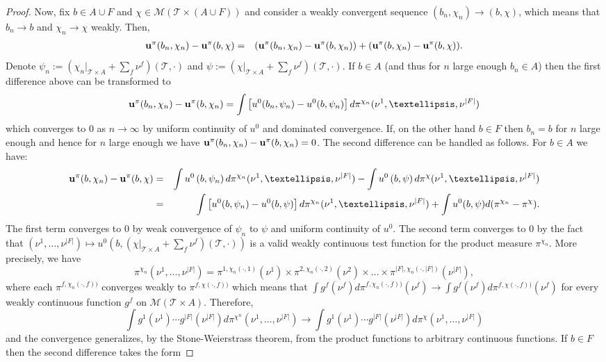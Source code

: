 \documentclass[10pt,a4paper]{amsart}
\begin{document}
\begin{proof}
Now, fix $b \in A \cup F$ and $\chi \in \mathcal{M}(\mathcal{T} \times (A \cup F))$ and consider a weakly convergent sequence $(b_n, \chi_n) \to (b, \chi)$, which means that $b_n \to b$ and $\chi_n \to \chi$ weakly. Then, 
\begin{eqnarray*}
\bold{u}^{\pi}(b_n,\chi_n) - \bold{u}^{\pi}(b,\chi) &=& (\bold{u}^{\pi}(b_n,\chi_n) - \bold{u}^{\pi}(b,\chi_n)) + (\bold{u}^{\pi}(b,\chi_n) - \bold{u}^{\pi}(b,\chi)).
\end{eqnarray*}
Denote $\psi_n := \left(\chi_n|_{\mathcal{T} \times A} + \sum_{f} \nu^f\right)(\mathcal{T},\cdot)$ and $\psi := \left(\chi|_{\mathcal{T} \times A} + \sum_{f} \nu^f\right)(\mathcal{T},\cdot)$. If $b \in A$ (and thus for $n$ large enough $b_n \in A$) then the first difference above can be transformed to
\begin{eqnarray*}
\bold{u}^{\pi}(b_n,\chi_n) - \bold{u}^{\pi}(b,\chi_n) =  \int \left[ u^{0}(b_n, \psi_n ) - u^{0}(b, \psi_n)\right] d\pi^{\chi_n}(\nu^1,\dots,\nu^{|F|})
\end{eqnarray*}
which converges to $0$ as $n \to \infty$ by uniform continuity of $u^0$ and dominated convergence. If, on the other hand $b \in F$ then $b_n = b$ for $n$ large enough and hence for $n$ large enough we have $\bold{u}^{\pi}(b_n,\chi_n) - \bold{u}^{\pi}(b,\chi_n) = 0$. 
The second difference can be handled as follows. For $b \in A$ we have:
\begin{eqnarray*}
\bold{u}^{\pi}(b,\chi_n) - \bold{u}^{\pi}(b,\chi) &=&    
\int  u^{0}\left(b, \psi_n \right) d\pi^{\chi_n}(\nu^1,\dots,\nu^{|F|}) - \int  u^{0}\left(b, \psi \right) d\pi^{\chi}(\nu^1,\dots,\nu^{|F|}) \\
&=& \int \left[u^0(b,\psi_n) - u^0(b,\psi)\right]d\pi^{\chi_n}(\nu^1,\dots,\nu^{|F|}) + \int u^0(b,\psi) d(\pi^{\chi_n} - \pi^{\chi}).
\end{eqnarray*}
The first term converges to $0$ by weak convergence of $\psi_n$ to $\psi$ and uniform continuity of $u^0$. The second term converges to $0$ by the fact that $(\nu^1,\dots,\nu^{|F|}) \mapsto u^{0}\left(b, \left(\chi|_{\mathcal{T} \times A} + \sum_{f} \nu^f\right)(\mathcal{T},\cdot)\right)$ is a valid weakly continuous test function for the product measure $\pi^{\chi_n}$. More precisely, we have $$\pi^{\chi_n} \left(\nu^1,\dots, \nu^{|F|}\right) = \pi^{1,\chi_n(\cdot,1)}(\nu^1) \times \pi^{2,\chi_n(\cdot,2)}(\nu^2) \times \dots \times \pi^{|F|,\chi_n(\cdot,|F|)}(\nu^{|F|}),$$ where each $\pi^{f,\chi_n(\cdot, f))}$ converges weakly to $\pi^{f,\chi(\cdot, f))}$ which means that $\int g^f(\nu^f) d \pi^{f,\chi_n(\cdot, f))}(\nu^f) \to \int g^f(\nu^f) d \pi^{f,\chi(\cdot, f))}(\nu^f)$ for every weakly continuous function $g^f$ on $\mathcal{M}(\mathcal{T} \times A)$.  Therefore, $$\int g^1(\nu^1)\cdots g^{|F|}(\nu^{|F|}) d \pi^{\chi^n}(\nu^1, \dots, \nu^{|F|}) \to \int g^1(\nu^1)\cdots g^{|F|}(\nu^{|F|}) d \pi^{\chi}(\nu^1, \dots, \nu^{|F|})$$ and the convergence generalizes, by the Stone-Weierstrass theorem, from the product functions to arbitrary continuous functions.  If $b \in F$ then the second difference takes the form 


\end{proof}
\end{document}

